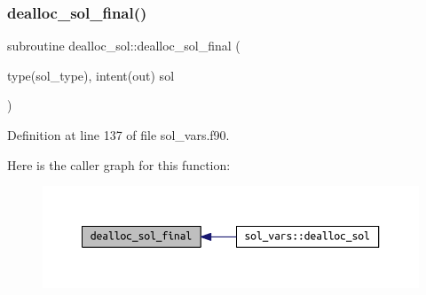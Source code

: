 \subsubsection{\texorpdfstring{dealloc\+\_\+sol\+\_\+final()}{dealloc\_sol\_final()}}
{\footnotesize\ttfamily subroutine dealloc\+\_\+sol\+::dealloc\+\_\+sol\+\_\+final (\begin{DoxyParamCaption}\item[{type(sol\+\_\+type), intent(out)}]{sol }\end{DoxyParamCaption})}



Definition at line 137 of file sol\+\_\+vars.\+f90.

Here is the caller graph for this function\+:
\nopagebreak
\begin{figure}[H]
\begin{center}
\leavevmode
\includegraphics[width=350pt]{sol__vars_8f90_aaf387ea01074131d40eb2a8aada68fc3_icgraph}
\end{center}
\end{figure}
